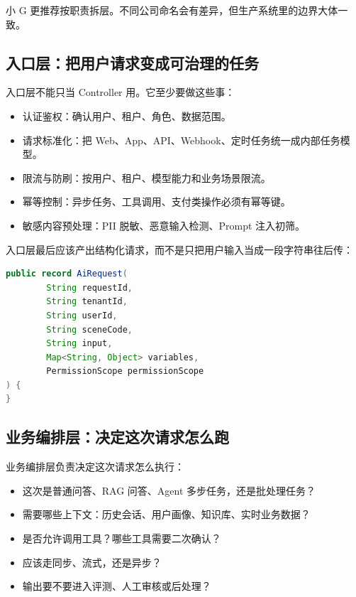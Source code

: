 \documentclass[10pt,a4paper]{ctexart}
\begin{document}
小 G 更推荐按职责拆层。不同公司命名会有差异，但生产系统里的边界大体一致。



\subsection{入口层：把用户请求变成可治理的任务}


入口层不能只当 Controller 用。它至少要做这些事：


\begin{itemize}[itemsep=2pt, topsep=4pt]
  \item 认证鉴权：确认用户、租户、角色、数据范围。
  \item 请求标准化：把 Web、App、API、Webhook、定时任务统一成内部任务模型。
  \item 限流与防刷：按用户、租户、模型能力和业务场景限流。
  \item 幂等控制：异步任务、工具调用、支付类操作必须有幂等键。
  \item 敏感内容预处理：PII 脱敏、恶意输入检测、Prompt 注入初筛。
\end{itemize}


入口层最后应该产出结构化请求，而不是只把用户输入当成一段字符串往后传：



\begin{lstlisting}[language=Java]
public record AiRequest(
        String requestId,
        String tenantId,
        String userId,
        String sceneCode,
        String input,
        Map<String, Object> variables,
        PermissionScope permissionScope
) {
}
\end{lstlisting}



\subsection{业务编排层：决定这次请求怎么跑}


业务编排层负责决定这次请求怎么执行：


\begin{itemize}[itemsep=2pt, topsep=4pt]
  \item 这次是普通问答、RAG 问答、Agent 多步任务，还是批处理任务？
  \item 需要哪些上下文：历史会话、用户画像、知识库、实时业务数据？
  \item 是否允许调用工具？哪些工具需要二次确认？
  \item 应该走同步、流式，还是异步？
  \item 输出要不要进入评测、人工审核或后处理？
\end{itemize}
\end{document}

